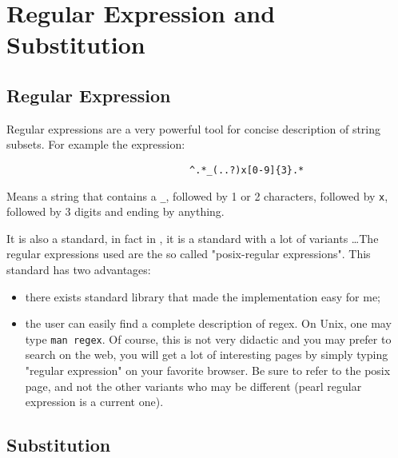 
\section{Regular Expression and Substitution}

\subsection{Regular Expression}

Regular expressions are a very powerful tool for concise description of string subsets.
For example the expression:

\begin{verbatim}
                                ^.*_(..?)x[0-9]{3}.*
\end{verbatim}

Means a string that contains a {\tt \_}, followed by 1 or 2 characters,
followed by {\tt x}, followed by $3$ digits and ending by anything.

It is also a standard, in fact  in , %
 it is a standard with a
lot of variants \dots The regular expressions used are the so called "posix-regular expressions".
This standard has two advantages:

\begin{itemize}
   \item there exists standard library that made the implementation easy for me;

    \item the user can easily find a complete description of regex. On Unix, one
         may type {\tt man regex}. Of course, this is not very didactic and you may
          prefer to search on the web, you will get a lot of interesting pages
          by simply typing "regular expression" on your favorite browser.  Be
          sure to refer to the posix page, and not the other variants
          who may be different (pearl regular expression is a current one).
         
\end{itemize}


\subsection{Substitution}

